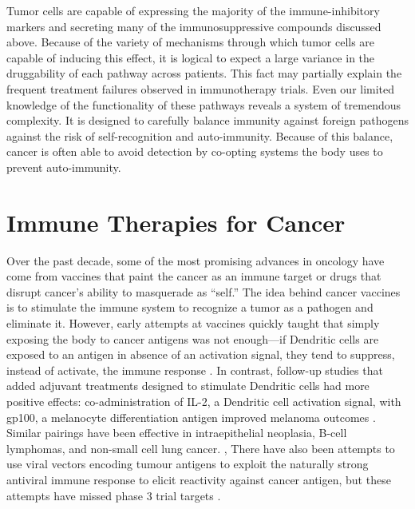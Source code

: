 Tumor cells are capable of expressing the majority of the immune-inhibitory markers and secreting many of the immunosuppressive compounds discussed above. 
Because of the variety of mechanisms through which tumor cells are capable of inducing this effect, it is logical to expect a large variance in the druggability of each pathway across patients. 
This fact may partially explain the frequent treatment failures observed in immunotherapy trials. 
Even our limited knowledge of the functionality of these pathways reveals a system of tremendous complexity. 
It is designed to carefully balance immunity against foreign pathogens against the risk of self-recognition and auto-immunity. 
Because of this balance, cancer is often able to avoid detection by co-opting systems the body uses to prevent auto-immunity. 

\section{Immune Therapies for Cancer}

Over the past decade, some of the most promising advances in oncology have come from vaccines that paint the cancer as an immune target or drugs that disrupt cancer’s ability to masquerade as ``self.'' 
The idea behind cancer vaccines is to stimulate the immune system to recognize a tumor as a pathogen and eliminate it. 
However, early attempts at vaccines quickly taught that simply exposing the body to cancer antigens was not enough---if Dendritic cells are exposed to an antigen in absence of an activation signal, they tend to suppress, instead of activate, the immune response \citep{Rosenberg2004}. 
In contrast, follow-up studies that added adjuvant treatments designed to stimulate Dendritic cells had more positive effects: 
co-administration of IL-2, a Dendritic cell activation signal, with gp100, a melanocyte differentiation antigen improved melanoma outcomes \citep{Eberlein2012}. 
Similar pairings have been effective in intraepithelial neoplasia, B-cell lymphomas, and non-small cell lung cancer. \citep{Eberlein2012,Stockman2011}, 
There have also been attempts to use viral vectors encoding tumour antigens to exploit the naturally strong antiviral immune response to elicit reactivity against cancer antigen, but these attempts have missed phase 3 trial targets \citep{BavarianNordic2017}.

